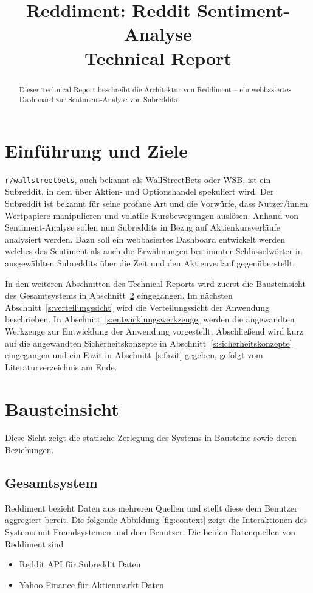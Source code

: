 \documentclass[a4paper, 10pt, conference]{IEEEtran}
\title{\LARGE
\textbf{Reddiment: Reddit Sentiment-Analyse} \\ Technical Report
}
\author{
\IEEEauthorblockN{Tobias Bauer} \IEEEauthorblockA{\textit{t.bauer@oth-aw.de}}\and
\IEEEauthorblockN{Fabian Beer} \IEEEauthorblockA{\textit{f.beer1@oth-aw.de}}\and
\IEEEauthorblockN{Daniel Holl} \IEEEauthorblockA{\textit{d.holl1@oth-aw.de}}\and\and[\\]\and
\IEEEauthorblockN{Ardian Imeraj} \IEEEauthorblockA{\textit{a.imeraj@oth-aw.de}}\and
\IEEEauthorblockN{Konrad Schweiger} \IEEEauthorblockA{\textit{k.schweiger@oth-aw.de}}\and
\IEEEauthorblockN{Philipp Stangl} \IEEEauthorblockA{\textit{p.stangl1@oth-aw.de}}\and
\IEEEauthorblockN{Wolfgang Weigl} \IEEEauthorblockA{\textit{w.weigl@oth-aw.de}}\and
}
\begin{document}
\maketitle
\thispagestyle{empty}
\pagestyle{empty}

\begin{abstract}
Dieser Technical Report beschreibt die Architektur von Reddiment -- ein webbasiertes Dashboard zur Sentiment-Analyse von Subreddits.
\end{abstract}

\section{Einführung und Ziele}

\texttt{r/wallstreetbets}, auch bekannt als WallStreetBets oder WSB, ist ein Subreddit, in dem über Aktien- und Optionshandel spekuliert wird.  Der Subreddit ist bekannt für seine profane Art und die Vorwürfe, dass Nutzer/innen Wertpapiere manipulieren und volatile Kursbewegungen auslösen. Anhand von Sentiment-Analyse sollen nun Subreddits in Bezug auf Aktienkursverläufe analysiert werden. Dazu soll ein webbasiertes Dashboard entwickelt werden welches das Sentiment als auch die Erwähnungen bestimmter Schlüsselwörter in ausgewählten Subreddits über die Zeit und den Aktienverlauf gegenüberstellt.

In den weiteren Abschnitten des Technical Reports wird zuerst die Bausteinsicht des Gesamtsystems in Abschnitt~\ref{s:bausteinsicht} eingegangen. Im nächsten Abschnitt~\ref{s:verteilungssicht} wird die Verteilungssicht der Anwendung beschrieben. In Abschnitt~\ref{s:entwicklungswerkzeuge} werden die angewandten Werkzeuge zur Entwicklung der Anwendung vorgestellt. Abschließend wird kurz auf die angewandten Sicherheitskonzepte in Abschnitt~\ref{s:sicherheitskonzepte} eingegangen und ein Fazit in Abschnitt~\ref{s:fazit} gegeben, gefolgt vom Literaturverzeichnis am Ende.

\section{Bausteinsicht} \label{s:bausteinsicht}
Diese Sicht zeigt die statische Zerlegung des Systems in Bausteine sowie deren Beziehungen.

\subsection{Gesamtsystem}
Reddiment bezieht Daten aus mehreren Quellen und stellt diese dem Benutzer aggregiert bereit. Die folgende Abbildung \ref{fig:context} zeigt die Interaktionen des Systems mit Fremdsystemen und dem Benutzer. Die beiden Datenquellen von Reddiment sind
\begin{itemize}
  \item Reddit API für Subreddit Daten
  \item Yahoo Finance für Aktienmarkt Daten
\end{itemize}
\end{document}
